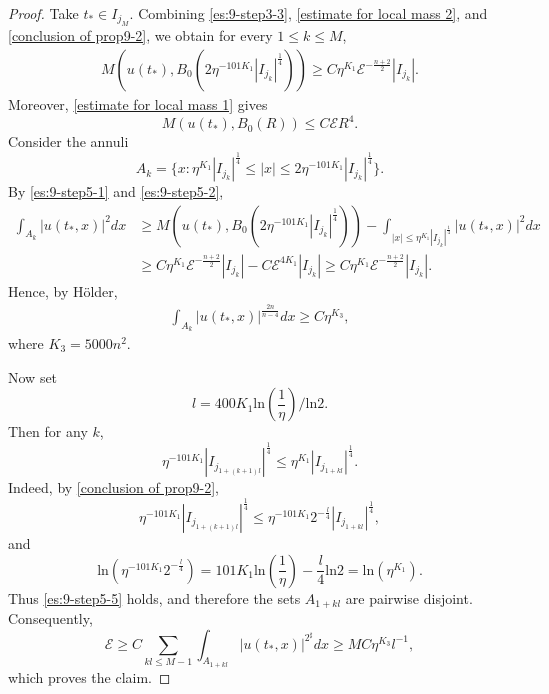 \documentclass[11pt,a4paper]{article}
\numberwithin{equation}{section}
\begin{document}
\begin{proof}
Take $t_{*}\in I_{j_{M}}$. Combining \eqref{es:9-step3-3}, \eqref{estimate for local mass 2}, and \eqref{conclusion of prop9-2}, we obtain for every $1 \leq k \leq M$,
\begin{equation}\label{es:9-step5-1}
\begin{aligned}
M\left(u(t_{*}), B_{0}(2\eta^{-101K_{1}}|I_{j_{k}}|^{\frac{1}{4}})\right)
\geq C\eta^{K_{1}}\mathcal{E}^{-\frac{n+2}{2}}|I_{j_{k}}|.
\end{aligned}
\end{equation}
Moreover, \eqref{estimate for local mass 1} gives
\begin{equation}\label{es:9-step5-2}
M\left( u(t_{*}), B_{0}(R) \right) \leq C\mathcal{E}R^{4}.
\end{equation}
Consider the annuli
\[
A_{k} = \{ x: \eta^{K_{1}}|I_{j_{k}}|^{\frac{1}{4}} \leq |x| \leq 2\eta^{-101K_{1}}|I_{j_{k}}|^{\frac{1}{4}} \}.
\]
By \eqref{es:9-step5-1} and \eqref{es:9-step5-2},
\begin{equation}\label{es:9-step5-3}
\begin{aligned}
\int_{A_{k}}|u(t_{*}, x)|^{2}dx
&\geq  M\left(u(t_{*}), B_{0}(2\eta^{-101K_{1}}|I_{j_{k}}|^{\frac{1}{4}})\right) - \int_{|x| \leq \eta^{K_{1}}|I_{j_{k}}|^{\frac{1}{4}}}|u(t_{*},x)|^{2}dx \\
&\geq C\eta^{K_{1}}\mathcal{E}^{-\frac{n+2}{2}}|I_{j_{k}}| - C\mathcal{E}^{4K_{1}}|I_{j_{k}}| \geq C\eta^{K_{1}}\mathcal{E}^{-\frac{n+2}{2}}|I_{j_{k}}|.
\end{aligned}
\end{equation}
Hence, by H\"older,
\begin{equation}\label{es:9-step5-4}
\begin{aligned}
\int_{A_{k}}|u(t_{*},x)|^{\frac{2n}{n-4}}dx \geq C\eta^{K_{3}},
\end{aligned}
\end{equation}
where $K_{3} = 5000n^{2}$.

Now set
\[
l = 400K_{1}\text{ln}\left(\frac{1}{\eta}\right)/\text{ln}2.
\]
Then for any $k$,
\begin{equation}\label{es:9-step5-5}
\eta^{-101K_{1}}|I_{j_{1 + (k+1)l}}|^{\frac{1}{4}} \leq \eta^{K_{1}}|I_{j_{1 + kl}}|^{\frac{1}{4}}.
\end{equation}
Indeed, by \eqref{conclusion of prop9-2},
\[
\eta^{-101K_{1}}|I_{j_{1 + (k+1)l}}|^{\frac{1}{4}} \leq \eta^{-101K_{1}} 2^{-\frac{l}{4}}|I_{j_{1 + kl}}|^{\frac{1}{4}},
\]
and
\[
\text{ln}(\eta^{-101K_{1}}2^{-\frac{l}{4}}) = 101K_{1}\text{ln}\left(\frac{1}{\eta}\right) - \frac{l}{4}\text{ln}2 = \text{ln}(\eta^{K_{1}}).
\]
Thus \eqref{es:9-step5-5} holds, and therefore the sets $A_{1 + kl}$ are pairwise disjoint.
Consequently,
\[
 \mathcal{E} \geq C\sum_{kl \leq M-1} \int_{A_{1 + kl}}|u(t_{*}, x)|^{2^{\sharp}}dx \geq MC\eta^{K_{3}}l^{-1},
\]
which proves the claim.
\end{proof}
\end{document}
